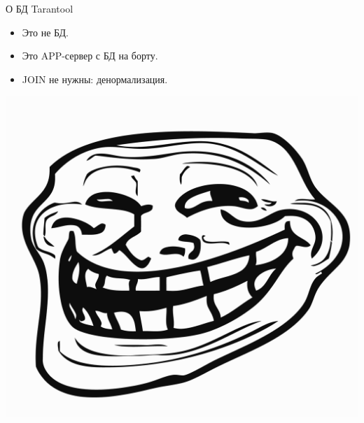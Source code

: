 \documentclass[aspectratio=169]{beamer}
\begin{document}
\begin{frame}{О БД Tarantool}
    \begin{itemize}
        \pause\item Это не БД.
        \pause\item Это APP-сервер с БД на борту.
        \pause\item JOIN не нужны: денормализация.
    \end{itemize}
    \begin{center}
        \includegraphics[scale=0.2]{img/Trollface_HD.png}
    \end{center}
\end{frame}



\begin{frame}
\end{frame}
\end{document}
